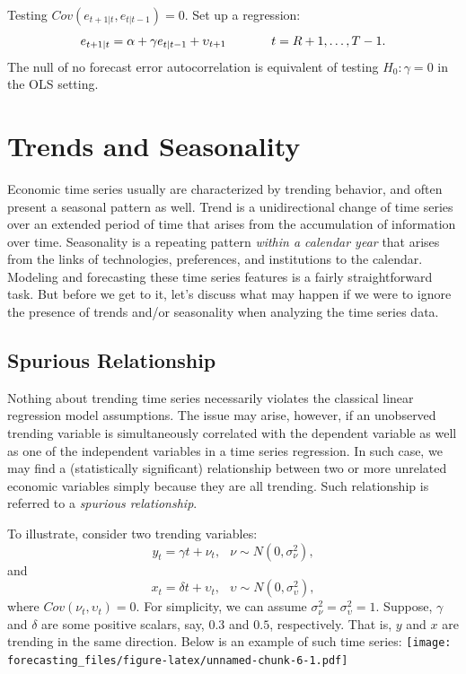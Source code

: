 \documentclass[
  12pt,
  oneside]{book}
\begin{document}
Testing \(Cov(e_{t+1|t},e_{t|t-1})=0\). Set up a regression: \[e_{t+1|t} = \alpha + \gamma e_{t|t-1} + \upsilon_{t+1} \hspace{.5in} t = R+1,\ldots,T-1.\] The null of no forecast error autocorrelation is equivalent of testing \(H_0: \gamma = 0\) in the OLS setting.

\hypertarget{trends-and-seasonality}{%
\chapter{Trends and Seasonality}\label{trends-and-seasonality}}

Economic time series usually are characterized by trending behavior, and often present a seasonal pattern as well. Trend is a unidirectional change of time series over an extended period of time that arises from the accumulation of information over time. Seasonality is a repeating pattern \emph{within a calendar year} that arises from the links of technologies, preferences, and institutions to the calendar. Modeling and forecasting these time series features is a fairly straightforward task. But before we get to it, let's discuss what may happen if we were to ignore the presence of trends and/or seasonality when analyzing the time series data.

\hypertarget{spurious-relationship}{%
\section{Spurious Relationship}\label{spurious-relationship}}

Nothing about trending time series necessarily violates the classical linear regression model assumptions. The issue may arise, however, if an unobserved trending variable is simultaneously correlated with the dependent variable as well as one of the independent variables in a time series regression. In such case, we may find a (statistically significant) relationship between two or more unrelated economic variables simply because they are all trending. Such relationship is referred to a \emph{spurious relationship}.

To illustrate, consider two trending variables: \[y_t = \gamma t + \nu_t,\;~~\nu\sim N(0,\sigma_{\nu}^2),\] and \[x_t = \delta t + \upsilon_t,\;~~\upsilon\sim N(0,\sigma_{\upsilon}^2),\] where \(Cov(\nu_t,\upsilon_t) = 0\). For simplicity, we can assume \(\sigma_{\nu}^2=\sigma_{\upsilon}^2=1\). Suppose, \(\gamma\) and \(\delta\) are some positive scalars, say, \(0.3\) and \(0.5\), respectively. That is, \(y\) and \(x\) are trending in the same direction. Below is an example of such time series:
\texttt{[image: forecasting\_files/figure-latex/unnamed-chunk-6-1.pdf]}
\end{document}
